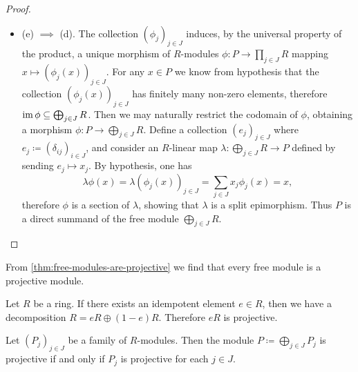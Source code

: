 \begin{proof}
\begin{itemize}
\item (e) \(\implies\) (d). The collection \((\phi_j)_{j \in J}\) induces, by
  the universal property of the product, a unique morphism of \(R\)-modules
  \(\phi: P \to \prod_{j \in J} R\) mapping \(x \mapsto (\phi_j(x))_{j \in
    J}\). For any \(x \in P\) we know from hypothesis that the collection
  \((\phi_j(x))_{j \in J}\) has finitely many non-zero elements, therefore
  \(\operatorname{im} \phi \subseteq \bigoplus_{j \in J} R\). Then we may naturally restrict
  the codomain of \(\phi\), obtaining a morphism
  \(\phi: P \to \bigoplus_{j \in J} R\). Define a collection \((e_j)_{j \in J}\)
  where \(e_j \coloneq (\delta_{ij})_{i \in J}\), and consider an \(R\)-linear
  map \(\lambda: \bigoplus_{j \in J} R \to P\) defined by sending
  \(e_j \mapsto x_j\). By hypothesis, one has
  \[
  \lambda \phi(x)
  = \lambda(\phi_j(x))_{j \in J}
  = \sum_{j \in J} x_j \phi_j(x)
  = x,
  \]
  therefore \(\phi\) is a section of \(\lambda\), showing that \(\lambda\) is a
  split epimorphism. Thus \(P\) is a direct summand of the free module
  \(\bigoplus_{j \in J} R\).
\end{itemize}
\end{proof}

\begin{example}
\label{exp:free-mod-is-projective}
From \cref{thm:free-modules-are-projective} we find that every free module is a
projective module.
\end{example}

\begin{example}
\label{exp:idempotent-ring-projective}
Let \(R\) be a ring. If there exists an idempotent element \(e \in R\), then we
have a decomposition \(R = e R \oplus (1 - e) R\). Therefore \(e R\) is
projective.
\end{example}

\begin{proposition}
\label{prop:direct-sum-projective}
Let \((P_j)_{j \in J}\) be a family of \(R\)-modules. Then the module
\(P \coloneq \bigoplus_{j \in J} P_j\) is projective if and only if \(P_j\) is
projective for each \(j \in J\).
\end{proposition}

